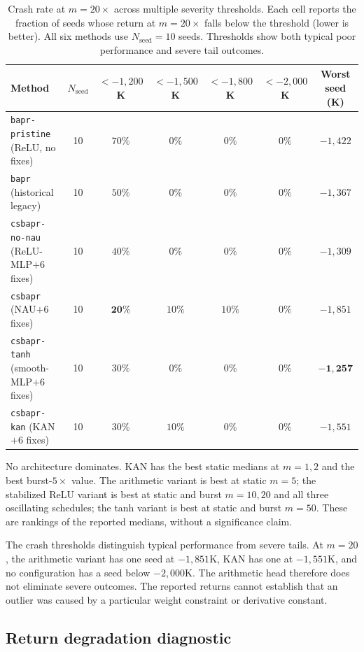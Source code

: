 \documentclass[10pt]{article}
\begin{document}
\begin{table}[htbp]
\centering
\scriptsize
\caption{Crash rate at $m{=}20{\times}$ across multiple severity thresholds. Each cell reports the fraction of seeds whose return at $m{=}20{\times}$ falls below the threshold (lower is better). All six methods use $N_{\mathrm{seed}}{=}10$ seeds. Thresholds show both typical poor performance and severe tail outcomes.}
\label{tab:crash}
\setlength{\tabcolsep}{5pt}
\begin{tabular}{lcccccc}
\toprule
Method & $N_{\mathrm{seed}}$ & $<{-}1{,}200$K & $<{-}1{,}500$K & $<{-}1{,}800$K & $<{-}2{,}000$K & Worst seed (K) \\
\midrule
\texttt{bapr-pristine} (ReLU, no fixes)        & 10 & $70\%$ & $0\%$  & $0\%$  & $0\%$ & $-1{,}422$ \\
\texttt{bapr} (historical legacy)           & 10 & $50\%$ & $0\%$  & $0\%$  & $0\%$ & $-1{,}367$ \\
\texttt{csbapr-no-nau} (ReLU-MLP$+$6 fixes)    & 10 & $40\%$ & $0\%$  & $0\%$  & $0\%$ & $-1{,}309$ \\
\texttt{csbapr} (NAU$+$6 fixes)                & 10 & $\mathbf{20\%}$ & $10\%$ & $10\%$ & $0\%$ & $-1{,}851$ \\
\texttt{csbapr-tanh} (smooth-MLP$+$6 fixes)    & 10 & $30\%$ & $0\%$  & $0\%$  & $0\%$ & $\mathbf{-1{,}257}$ \\
\texttt{csbapr-kan} (KAN$+$6 fixes)            & 10 & $30\%$ & $10\%$ & $0\%$  & $0\%$ & $-1{,}551$ \\
\bottomrule
\end{tabular}
\end{table}

No architecture dominates. KAN has the best static medians at $m=1,2$ and the best burst-$5\times$ value. The arithmetic variant is best at static $m=5$; the stabilized ReLU variant is best at static and burst $m=10,20$ and all three oscillating schedules; the tanh variant is best at static and burst $m=50$. These are rankings of the reported medians, without a significance claim.

The crash thresholds distinguish typical performance from severe tails. At $m=20$, the arithmetic variant has one seed at $-1{,}851$K, KAN has one at $-1{,}551$K, and no configuration has a seed below $-2{,}000$K. The arithmetic head therefore does not eliminate severe outcomes. The reported returns cannot establish that an outlier was caused by a particular weight constraint or derivative constant.

\subsection{Return degradation diagnostic}
\label{sec:bound_alignment}
\end{document}
